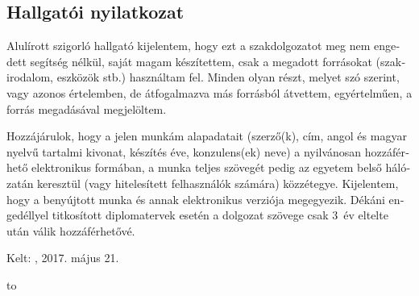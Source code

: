 \begin{otherlanguage}{magyar}

  \chapter*{Hallgatói nyilatkozat}
  \thispagestyle{plain}

  Alulírott \textbf{\authorihun} szigorló hallgató kijelentem, hogy ezt
  a szakdolgozatot meg nem engedett segítség nélkül, saját magam
  készítettem, csak a megadott forrásokat (szakirodalom, eszközök stb.)
  használtam fel. Minden olyan részt, melyet szó szerint, vagy azonos
  értelemben, de átfogalmazva más forrásból átvettem, egyértelműen, a
  forrás megadásával megjelöltem.

  Hozzájárulok, hogy a jelen munkám alapadatait (szerző(k), cím, angol
  és magyar nyelvű tartalmi kivonat, készítés éve, konzulens(ek) neve) a
    nyilvánosan hozzáférhető elektronikus
  formában, a munka teljes szövegét pedig az egyetem belső hálózatán
  keresztül (vagy hitelesített felhasználók számára)
  közzétegye. Kijelentem, hogy a benyújtott munka és annak elektronikus
  verziója megegyezik. Dékáni engedéllyel titkosított diplomatervek
  esetén a dolgozat szövege csak 3~év eltelte után válik hozzáférhetővé.

  \vspace{4ex}

  \noindent Kelt: \viktdklocation, 2017. május 21.

  \vspace{20ex}

  \hfill\begin{minipage}{0.4\linewidth}
    \centering\hbox to \par
    \centering\authorihun\par
  \end{minipage}

\end{otherlanguage}

